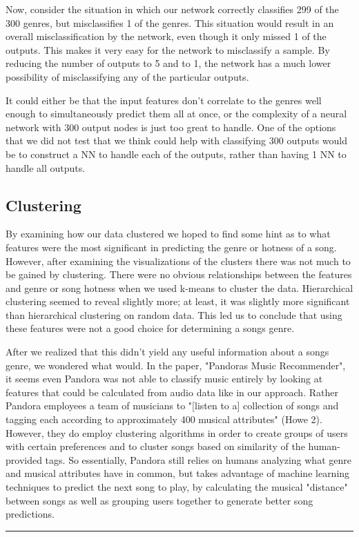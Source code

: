 \documentclass[12pt]{article}
\newcommand{\horizontalLine}{
	\begin{center}
		\hrule width 1.0\textwidth
	\end{center}
}
\begin{document}
Now, consider the situation in which our network correctly classifies 299 of the 300 genres, but misclassifies 1 of the genres. This situation would result in an overall misclassification by the network, even though it only missed 1 of the outputs. This makes it very easy for the network to misclassify a sample. By reducing the number of outputs to 5 and to 1, the network has a much lower possibility of misclassifying any of the particular outputs. 

It could either be that the input features don't correlate to the genres well enough to simultaneously predict them all at once, or the complexity of a neural network with 300 output nodes is just too great to handle. One of the options that we did not test that we think could help with classifying 300 outputs would be to construct a NN to handle each of the outputs, rather than having 1 NN to handle all outputs. 

\subsection{Clustering}
\label{subsec:clusteringDisc}
By examining how our data clustered we hoped to find some hint as to what features were the most significant in predicting the genre or hotness of a song.
However, after examining the visualizations of the clusters there was not much to be gained by clustering. There were no obvious relationships between
the features and genre or song hotness when we used k-means to cluster the data. Hierarchical clustering seemed to reveal slightly more; at least, it was slightly more significant than hierarchical clustering on random data. This led us to conclude that using these features were not a good choice for 
determining a songs genre. 

After we realized that this didn't yield any useful information about a songs genre, we wondered what would. In the paper, "Pandoras Music
Recommender", it seems even Pandora was not able to classify music entirely by looking at features that could be calculated from audio data like in 
our approach. Rather Pandora employees a team of musicians to "[listen to a] collection of songs and tagging each according to
approximately 400 musical attributes" (Howe 2). However, they do employ clustering algorithms in order to create groups of users with certain preferences and
to cluster songs based on similarity of the human-provided tags.
So essentially, Pandora still relies on humans analyzing what genre and musical attributes have in common, but takes advantage of machine learning techniques
to predict the next song to play, by calculating the musical "distance" between songs as well as grouping users together to generate better song predictions.
\horizontalLine
\end{document}
